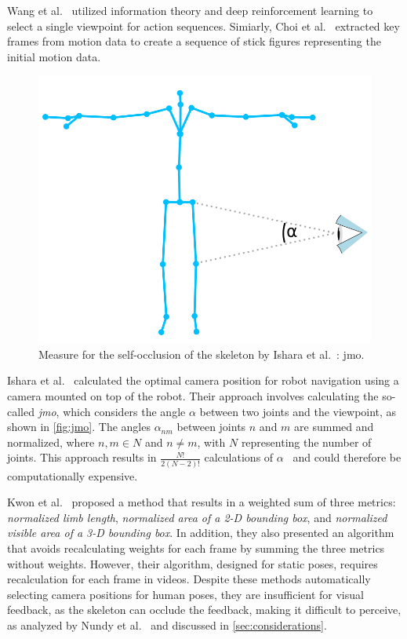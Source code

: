 Wang et al.~\cite{wang2019asw} utilized information theory and deep reinforcement learning to select a single viewpoint for action sequences. Simiarly, Choi et al.~\cite{choi2012rav} extracted key frames from motion data to create a sequence of stick figures representing the initial motion data.

\begin{figure}[ht]
	\centering
	\includegraphics[width=0.6\linewidth]{pictures/skeleton_E_occ.png}
	\caption[Measure for the self-occlusion of the skeleton by Ishara et al.~\cite{ishara2015mra}.]{Measure for the self-occlusion of the skeleton by Ishara et al.~\cite{ishara2015mra}: \acrlong{jmo}.}
	\label{fig:jmo}
\end{figure}

Ishara et al.~\cite{ishara2015mra} calculated the optimal camera position for robot navigation using a camera mounted on top of the robot. Their approach involves calculating the so-called \emph{\acrfull{jmo}}, which considers the angle \(\alpha\) between two joints and the viewpoint, as shown in \autoref{fig:jmo}. The angles \(\alpha_{nm}\) between joints \(n\) and \(m\) are summed and normalized, where \(n,m \in N\) and \(n \neq m\), with \(N\) representing the number of joints. This approach results in \(\frac{N!}{2(N-2)!}\) calculations of \(\alpha\)~\cite{charalambides2002enumerative} and could therefore be computationally expensive. 

Kwon et al.~\cite{kwon2020ocp} proposed a method that results in a weighted sum of three metrics: \emph{normalized limb length}, \emph{normalized area of a 2-D bounding box}, and \emph{normalized visible area of a 3-D bounding box}. In addition, they also presented an algorithm that avoids recalculating weights for each frame by summing the three metrics without weights. However, their algorithm, designed for static poses, requires recalculation for each frame in videos. Despite these methods automatically selecting camera positions for human poses, they are insufficient for visual feedback, as the skeleton can occlude the feedback, making it difficult to perceive, as analyzed by Nundy et al.~\cite{nundy2000wam} and discussed in \autoref{sec:considerations}.

